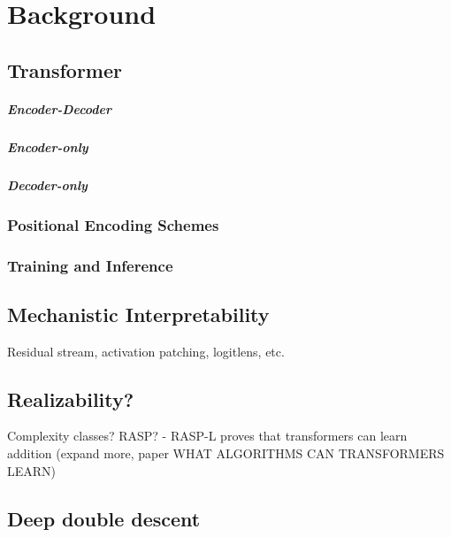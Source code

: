 \chapter{Background}\label{background}


\section{Transformer}\label{sec:transformer_arch}

\paragraph{Encoder-Decoder}
\paragraph{Encoder-only}
\paragraph{Decoder-only}


\subsection{Positional Encoding Schemes}\label{subsec:positional_encoding}



\subsection{Training and Inference}\label{subsec:training_inference}


\section{Mechanistic Interpretability}\label{sec:mech_interp}

Residual stream, activation patching, logitlens, etc.

\section{Realizability?}\label{sec:realizability}

Complexity classes? RASP?
- RASP-L proves that transformers can learn addition (expand more, paper WHAT ALGORITHMS CAN TRANSFORMERS LEARN)

\section{Deep double descent}\label{sec:interpretability}